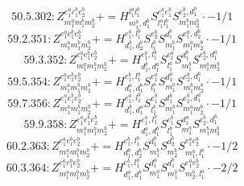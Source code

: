 \documentclass[letterpaper,10pt,fleqn,leqno,onecolumn]{article}
\begin{document}
\begin{equation} \;\;\;\;\;\;  50.5.302: Z^{e_{1}^{a}e_{1}^{b}e_{2}^{b}}_{m_{1}^{a}m_{1}^{b}m_{2}^{b}}+=H^{l_{1}^{a}l_{1}^{b}}_{m_{1}^{a},d_{1}^{b}}S^{e_{1}^{a}e_{1}^{b}}_{l_{1}^{a}l_{1}^{b}}S^{e_{2}^{b},d_{1}^{b}}_{m_{1}^{b}m_{2}^{b}}\cdot -1/1 \end{equation}
\begin{equation} \;\;\;\;\;\;  59.2.351: Z^{e_{1}^{a}e_{1}^{b}e_{2}^{b}}_{m_{1}^{a}m_{1}^{b}m_{2}^{b}}+=H^{e_{1}^{b},l_{1}^{b}}_{d_{1}^{b},d_{2}^{b}}S^{e_{2}^{b}}_{l_{1}^{b}}S^{d_{1}^{b}}_{m_{1}^{b}}S^{e_{1}^{a},d_{2}^{b}}_{m_{1}^{a}m_{2}^{b}}\cdot -1/1 \end{equation}
\begin{equation} \;\;\;\;\;\;  59.3.352: Z^{e_{1}^{a}e_{1}^{b}e_{2}^{b}}_{m_{1}^{a}m_{1}^{b}m_{2}^{b}}+=H^{e_{1}^{b},l_{1}^{a}}_{d_{1}^{b},d_{1}^{a}}S^{e_{1}^{a}}_{l_{1}^{a}}S^{d_{1}^{b}}_{m_{1}^{b}}S^{e_{2}^{b},d_{1}^{a}}_{m_{1}^{a}m_{2}^{b}} \end{equation}
\begin{equation} \;\;\;\;\;\;  59.5.354: Z^{e_{1}^{a}e_{1}^{b}e_{2}^{b}}_{m_{1}^{a}m_{1}^{b}m_{2}^{b}}+=H^{e_{1}^{b},l_{1}^{a}}_{d_{1}^{a},d_{1}^{b}}S^{e_{1}^{a}}_{l_{1}^{a}}S^{d_{1}^{a}}_{m_{1}^{a}}S^{e_{2}^{b},d_{1}^{b}}_{m_{1}^{b}m_{2}^{b}}\cdot -1/1 \end{equation}
\begin{equation} \;\;\;\;\;\;  59.7.356: Z^{e_{1}^{a}e_{1}^{b}e_{2}^{b}}_{m_{1}^{a}m_{1}^{b}m_{2}^{b}}+=H^{e_{1}^{a},l_{1}^{b}}_{d_{1}^{b},d_{1}^{a}}S^{e_{1}^{b}}_{l_{1}^{b}}S^{d_{1}^{b}}_{m_{1}^{b}}S^{e_{2}^{b},d_{1}^{a}}_{m_{1}^{a}m_{2}^{b}}\cdot -1/1 \end{equation}
\begin{equation} \;\;\;\;\;\;  59.9.358: Z^{e_{1}^{a}e_{1}^{b}e_{2}^{b}}_{m_{1}^{a}m_{1}^{b}m_{2}^{b}}+=H^{e_{1}^{a},l_{1}^{b}}_{d_{1}^{a},d_{1}^{b}}S^{e_{1}^{b}}_{l_{1}^{b}}S^{d_{1}^{a}}_{m_{1}^{a}}S^{e_{2}^{b},d_{1}^{b}}_{m_{1}^{b}m_{2}^{b}} \end{equation}
\begin{equation} \;\;\;\;\;\;  60.2.363: Z^{e_{1}^{a}e_{1}^{b}e_{2}^{b}}_{m_{1}^{a}m_{1}^{b}m_{2}^{b}}+=H^{e_{1}^{b},l_{1}^{b}}_{d_{1}^{b},d_{2}^{b}}S^{d_{1}^{b}}_{m_{1}^{b}}S^{d_{2}^{b}}_{m_{2}^{b}}S^{e_{1}^{a}e_{2}^{b}}_{m_{1}^{a},l_{1}^{b}}\cdot -1/2 \end{equation}
\begin{equation} \;\;\;\;\;\;  60.3.364: Z^{e_{1}^{a}e_{1}^{b}e_{2}^{b}}_{m_{1}^{a}m_{1}^{b}m_{2}^{b}}+=H^{e_{1}^{b},l_{1}^{a}}_{d_{1}^{a},d_{1}^{b}}S^{d_{1}^{a}}_{m_{1}^{a}}S^{d_{1}^{b}}_{m_{1}^{b}}S^{e_{1}^{a}e_{2}^{b}}_{m_{2}^{b},l_{1}^{a}}\cdot -2/2 \end{equation}
\end{document}

